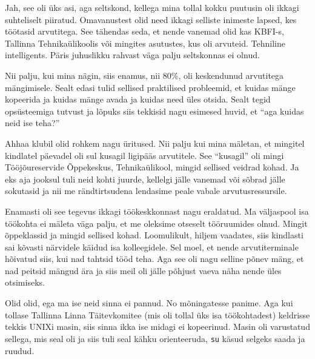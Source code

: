 
Jah, see oli üks asi, aga seltskond, kellega mina tollal kokku puutusin oli 
ikkagi suhteliselt piiratud. Omavanustest olid need ikkagi selliste inimeste 
lapsed, kes töötasid arvutitega. See tähendas seda, et nende vanemad olid kas 
KBFI-s, Tallinna Tehnikaülikoolis või mingites asutustes, kus oli arvuteid. 
Tehniline intelligents. Päris juhuslikku rahvast väga palju seltskonnas ei 
olnud.

Nii palju, kui mina nägin, siis enamus, nii 80\%, oli keskendunud arvutitega 
mängimisele. Sealt edasi tulid sellised praktilised probleemid, et kuidas mänge 
kopeerida ja kuidas mänge avada ja kuidas need üles otsida. Sealt tegid 
opsüsteemiga tutvust ja lõpuks siis tekkisid nagu esimesed huvid, et 
\enquote{aga kuidas neid ise teha?}
                 

Ahhaa klubil olid rohkem nagu üritused. Nii palju kui mina mäletan, et mingitel 
kindlatel päevadel oli sul kusagil ligipääs arvutitele. See \enquote{kusagil} 
oli mingi Tööjõureservide Õppekeskus, Tehnikaülikool, mingid sellised veidrad 
kohad.
Ja eks aja jooksul tuli neid kohti juurde, kellelgi jälle vanemad või sõbrad 
jälle sokutasid ja nii me rändtirtsudena lendasime peale vabale 
arvutusressursile.

                 
Enamasti oli see tegevus ikkagi  töökeskkonnast nagu eraldatud. Ma väljaspool 
isa töökohta ei mäleta väga palju, et me oleksime otseselt tööruumides 
olnud. Mingit õppeklassid ja mingid sellised kohad. Loomulikult, hiljem 
vaadates, siis kindlasti sai kõvasti närvidele käidud isa kolleegidele. Sel 
moel, et nende arvutiterminale hõivatud siis, kui nad tahtsid tööd teha. Aga 
see oli nagu selline põnev mäng, et nad peitsid mängud ära ja siis meil oli 
jälle põhjust vaeva näha nende üles otsimiseks.


Olid olid, ega ma ise neid sinna ei pannud. No mõningatesse panime. Aga  kui 
tollase Tallinna Linna Täitevkomitee (mis oli tollal üks isa töökohtadest) 
keldrisse tekkis UNIXi masin, siis sinna ikka ise midagi  ei kopeerinud. Masin 
oli  varustatud sellega, mis seal oli ja siis tuli seal kähku orienteeruda, 
\verb|su| käsud selgeks saada ja ruudud.

